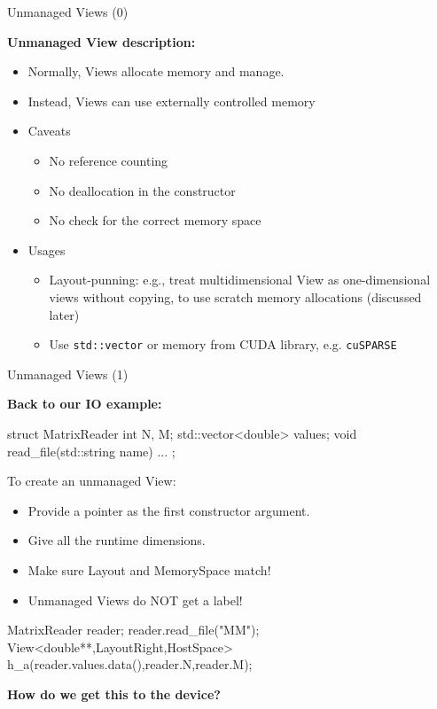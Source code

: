 \begin{frame}[fragile]{Unmanaged Views (0)}

  \textbf{Unmanaged View description:}

  \vspace{5pt}
  \begin{itemize}
    \item{Normally, Views allocate memory and manage.}
    \item{Instead, Views can use externally controlled memory}
    \pause
    \item{Caveats}
    \begin{itemize}
      \item{No reference counting}
      \item{No deallocation in the constructor}
      \item{No check for the correct memory space}
    \end{itemize}
    \item{Usages}
    \begin{itemize}
      \item{Layout-punning: e.g., treat multidimensional View as one-dimensional views without copying, to use scratch memory allocations (discussed later)}
      \item{Use \texttt{std::vector} or memory from CUDA library, e.g. \texttt{cuSPARSE}}
    \end{itemize}
  \end{itemize}

\end{frame}


\begin{frame}[fragile]{Unmanaged Views (1)}

  \textbf{Back to our IO example:}
  \begin{code}[keywords={int,vector,string,double}]
struct MatrixReader {
  int N, M;
  std::vector<double> values;
  void read_file(std::string name) {...}
};
  \end{code}
  
  To create an unmanaged View:
  \begin{itemize}
   \item Provide a pointer as the first constructor argument.
   \item Give all the runtime dimensions.
   \item Make sure Layout and MemorySpace match!
   \item Unmanaged Views do NOT get a label!
  \end{itemize}

  \pause
  \begin{code}[keywords={View,double,LayoutRight,HostSpace,MemoryTraits,Unmanaged}]
MatrixReader reader; reader.read_file("MM");
View<double**,LayoutRight,HostSpace>
  h_a(reader.values.data(),reader.N,reader.M);
  \end{code}

  \pause
  \textbf{How do we get this to the device?}

\end{frame}

